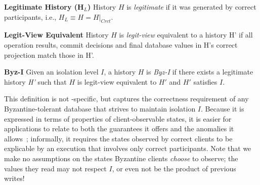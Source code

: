 \par\textbf{Legitimate History (H$_L$)} History $H$ is \textit{legitimate} if it was generated by correct participants, i.e., $H_L \equiv H = H|_{Crct}$.

\par\textbf{Legit-View Equivalent}  History $H$ is \textit{legit-view} equivalent to a history H' if all operation results, commit decisions and final database values in H's correct projection match those in H'.



\par \textbf{Byz-I} Given  an isolation level $I$,
a history $H$ is \textit{Byz-I} if there exists a legitimate history \textit{H'} such that $H$ is legit-view equivalent to $H'$ and $H'$ satisfies $I$.


This definition is not \sys-specific, but captures the correctness requirement of any Byzantine-tolerant database that strives to maintain isolation $I$. Because it is  expressed in terms of properties of client-observable states, it is easier for applications to relate to both the guarantees it offers and the anomalies it allows~\cite{crooks17seeing}; informally, it requires the states observed by correct clients to be explicable by an execution that involves only correct participants.  Note that we make no assumptions on the states  Byzantine clients \textit{choose} to observe; the values they read may not respect $I$, or even not be the product of previous writes!


